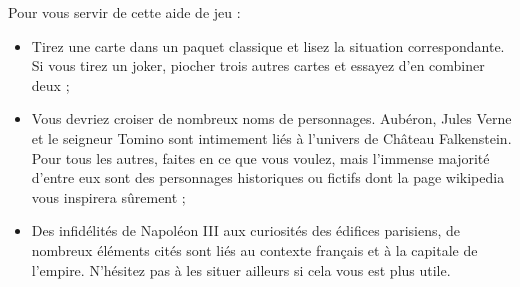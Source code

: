 \documentclass[a5paper,pagesize,french]{book}
\begin{document}

Pour vous servir de cette aide de jeu :
\begin{itemize}
	\footnotesize
	\item Tirez une carte dans un paquet classique et lisez la situation correspondante. Si vous tirez un joker, piocher trois autres cartes et essayez d'en combiner deux ;
	\item Vous devriez croiser de nombreux noms de personnages. Aubéron, Jules Verne et le seigneur Tomino sont intimement liés à l'univers de Château Falkenstein. Pour tous les autres, faites en ce que vous voulez, mais l'immense majorité d'entre eux sont des personnages historiques ou fictifs dont la page wikipedia vous inspirera sûrement ;
	\item Des infidélités de Napoléon III aux curiosités des édifices parisiens, de nombreux éléments cités sont liés au contexte français et à la capitale de l'empire. N'hésitez pas à les situer ailleurs si cela vous est plus utile.
\end{itemize}~\\
\end{document}
